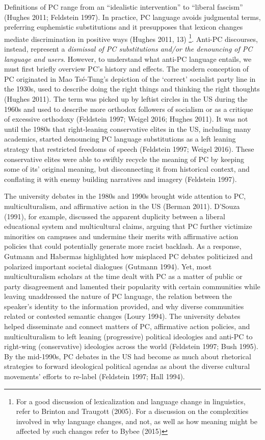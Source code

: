 \documentclass[smallextended]{svjour3}       %
\begin{document}
Definitions of PC range from an ``idealistic intervention'' to ``liberal
fascism'' (Hughes 2011; Feldstein 1997). In practice, PC language avoids
judgmental terms, preferring euphemistic substitutions and it
presupposes that lexicon changes mediate discrimination in positive ways
(Hughes 2011, 13) \footnote{ For a good discussion of lexicalization and
  language change in linguistics, refer to Brinton and Traugott (2005).
  For a discussion on the complexities involved in why language changes,
  and not, as well as how meaning might be affected by such changes
  refer to Bybee (2015)}. Anti-PC discourses, instead, represent a
\emph{dismissal of PC substitutions and/or the denouncing of PC language
and users}. However, to understand what anti-PC language entails, we
must first briefly overview PC's history and effects. The modern
conception of PC originated in Mao Tsé-Tung's depiction of the `correct'
socialist party line in the 1930s, used to describe doing the right
things and thinking the right thoughts (Hughes 2011). The term was
picked up by leftist circles in the US during the 1960s and used to
describe more orthodox followers of socialism or as a critique of
excessive orthodoxy (Feldstein 1997; Weigel 2016; Hughes 2011). It was
not until the 1980s that right-leaning conservative elites in the US,
including many academics, started denouncing PC language substitutions
as a left leaning strategy that restricted freedoms of speech (Feldstein
1997; Weigel 2016). These conservative elites were able to swiftly
recycle the meaning of PC by keeping some of its' original meaning, but
disconnecting it from historical context, and conflating it with enemy
building narratives and imagery (Feldstein 1997).

The university debates in the 1980s and 1990s brought wide attention to
PC, multiculturalism, and affirmative action in the US (Berman 2011).
D'Souza (1991), for example, discussed the apparent duplicity between a
liberal educational system and multicultural claims, arguing that PC
further victimize minorities on campuses and undermine their merits with
affirmative action policies that could potentially generate more racist
backlash. As a response, Gutmann and Habermas highlighted how misplaced
PC debates politicized and polarized important societal dialogues
(Gutmann 1994). Yet, most multiculturalism scholars at the time dealt
with PC as a matter of public or party disagreement and lamented their
popularity with certain communities while leaving unaddressed the nature
of PC language, the relation between the speaker's identity to the
information provided, and why diverse communities related or contested
semantic changes (Loury 1994). The university debates helped disseminate
and connect matters of PC, affirmative action policies, and
multiculturalism to left leaning (progressive) political ideologies and
anti-PC to right-wing (conservative) ideologies across the world
(Feldstein 1997; Bush 1995). By the mid-1990s, PC debates in the US had
become as much about rhetorical strategies to forward ideological
political agendas as about the diverse cultural movements' efforts to
re-label (Feldstein 1997; Hall 1994).
\end{document}
